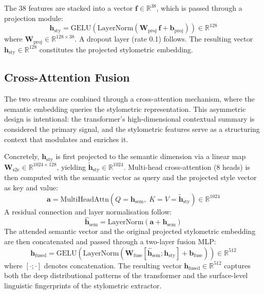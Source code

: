 \documentclass[]{ceurart}
\begin{document}
The 38 features are stacked into a vector $\mathbf{f} \in \mathbb{R}^{38}$, which is passed through a projection module:
\begin{equation}
  \mathbf{h}_\text{sty} = \text{GELU}(\text{LayerNorm}(\mathbf{W}_\text{proj}\,\mathbf{f} + \mathbf{b}_\text{proj})) \in \mathbb{R}^{128}
\end{equation}
where $\mathbf{W}_\text{proj} \in \mathbb{R}^{128 \times 38}$. A dropout layer (rate 0.1) follows. The resulting vector $\mathbf{h}_\text{sty} \in \mathbb{R}^{128}$ constitutes the projected stylometric embedding.

\subsection{Cross-Attention Fusion}

The two streams are combined through a cross-attention mechanism, where the semantic embedding queries the stylometric representation. This asymmetric design is intentional: the transformer's high-dimensional contextual summary is considered the primary signal, and the stylometric features serve as a structuring context that modulates and enriches it.

Concretely, $\mathbf{h}_\text{sty}$ is first projected to the semantic dimension via a linear map $\mathbf{W}_\text{s2e} \in \mathbb{R}^{1024 \times 128}$, yielding $\tilde{\mathbf{h}}_\text{sty} \in \mathbb{R}^{1024}$. Multi-head cross-attention (8 heads) is then computed with the semantic vector as query and the projected style vector as key and value:
\begin{equation}
  \mathbf{a} = \text{MultiHeadAttn}(Q=\mathbf{h}_\text{sem},\; K=V=\tilde{\mathbf{h}}_\text{sty}) \in \mathbb{R}^{1024}
\end{equation}
A residual connection and layer normalisation follow:
\begin{equation}
  \hat{\mathbf{h}}_\text{sem} = \text{LayerNorm}(\mathbf{a} + \mathbf{h}_\text{sem})
\end{equation}
The attended semantic vector and the original projected stylometric embedding are then concatenated and passed through a two-layer fusion MLP:
\begin{equation}
  \mathbf{h}_\text{fused} = \text{GELU}(\text{LayerNorm}(\mathbf{W}_\text{fuse}[\hat{\mathbf{h}}_\text{sem};\mathbf{h}_\text{sty}] + \mathbf{b}_\text{fuse})) \in \mathbb{R}^{512}
\end{equation}
where $[\cdot;\cdot]$ denotes concatenation. The resulting vector $\mathbf{h}_\text{fused} \in \mathbb{R}^{512}$ captures both the deep distributional patterns of the transformer and the surface-level linguistic fingerprints of the stylometric extractor.
\end{document}
